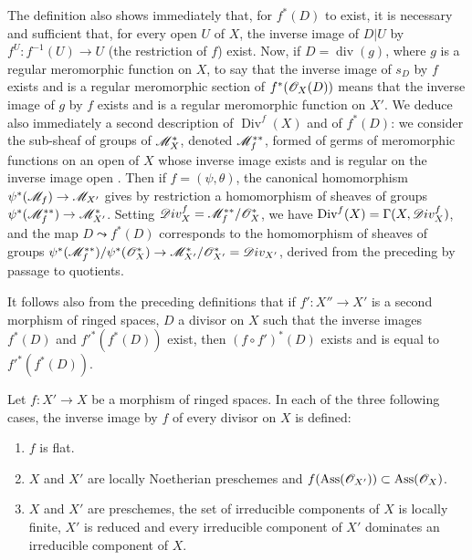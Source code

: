 \begin{env}[21.4.3]
\label{IV.21.4.3}
The definition  also shows immediately that, for $f^*(D)$ to exist, it is necessary and sufficient that, for every open $U$ of $X$, the inverse image of $D|U$ by $f^U:f^{-1}(U)\to U$ (the restriction of $f$) exist.
Now, if $D=\operatorname{div}(g)$, where $g$ is a regular meromorphic function on $X$, to say that the inverse image of $s_D$ by $f$ exists and is a regular meromorphic section of $f^*(\mathscr{O}_X(D))$ means  that the inverse image of $g$ by $f$ exists and is a regular meromorphic function on $X'$.
We deduce also immediately a second description of $\operatorname{Div}^f(X)$ and of $f^*(D)$: we consider the sub-sheaf of groups of $\mathscr{M}_X^*$, denoted $\mathscr{M}_f^{**}$, formed of germs of meromorphic functions on an open of $X$ whose inverse image exists and is regular on the inverse image open .
Then if $f=(\psi,\theta)$, the canonical homomorphism  $\psi^*(\mathscr{M}_f)\to\mathscr{M}_{X'}$ gives by restriction a homomorphism of sheaves of groups $\psi^*(\mathscr{M}_f^{**})\to\mathscr{M}_{X'}^*$.
Setting $\mathscr{D}iv_X^f=\mathscr{M}_f^{**}/\mathscr{O}_X^*$, we have $\operatorname{Div}^f(X)=\Gamma(X,\mathscr{D}iv_X^f)$, and the map $D\leadsto f^*(D)$ corresponds to the homomorphism of sheaves of groups $\psi^*(\mathscr{M}_f^{**})/\psi^*(\mathscr{O}_X^*)\to\mathscr{M}_{X'}^*/\mathscr{O}_{X'}^*=\mathscr{D}iv_{X'}$, derived from the preceding by passage to quotients.
\end{env}

\begin{env}[21.4.4]
\label{IV.21.4.4}
It follows also from the preceding definitions that if $f':X''\to X'$ is a second morphism of ringed spaces, $D$ a divisor on $X$ such that the inverse images $f^*(D)$ and $f'^*(f^*(D))$ exist, then $(f\circ f')^*(D)$ exists and is equal to $f'^*(f^*(D))$.
\end{env}

\begin{proposition}[21.4.5]
\label{IV.21.4.5}
Let $f:X'\to X$ be a morphism of ringed spaces.
In each of the three following cases, the inverse image by $f$ of every divisor on $X$ is defined:
\begin{enumerate}[label=\textup{(\roman*)}]
  \item $f$ is flat.
  \item $X$ and $X'$ are locally Noetherian preschemes and $f(\operatorname{Ass}(\mathscr{O}_{X'}))\subset\operatorname{Ass}(\mathscr{O}_X)$.
  \item $X$ and $X'$ are preschemes, the set of irreducible components of $X$ is locally finite, $X'$ is reduced and every irreducible component of $X'$ dominates an irreducible component of $X$.
\end{enumerate}
\end{proposition}

